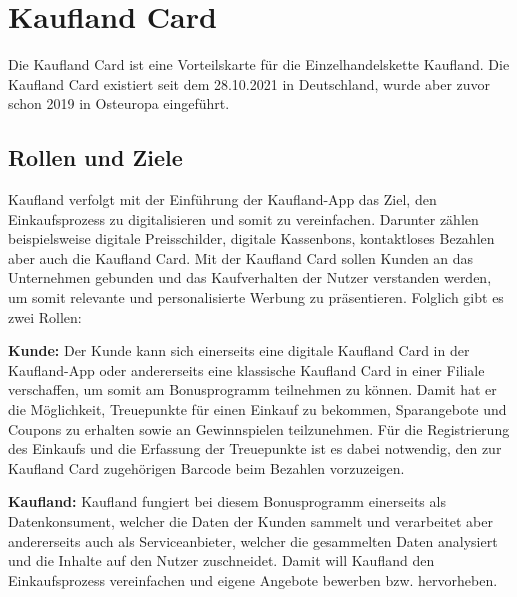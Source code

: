 \section{Kaufland Card}
Die Kaufland Card ist eine Vorteilskarte für die Einzelhandelskette Kaufland. Die Kaufland Card existiert seit dem 28.10.2021 in Deutschland, wurde aber zuvor schon 2019 in Osteuropa eingeführt.

\subsection{Rollen und Ziele}
Kaufland verfolgt mit der Einführung der Kaufland-App das Ziel, den Einkaufsprozess zu digitalisieren und somit zu vereinfachen. Darunter zählen beispielsweise digitale Preisschilder, digitale Kassenbons, kontaktloses Bezahlen aber auch die Kaufland Card. \cite{Kaufland_Ziele} Mit der Kaufland Card sollen Kunden an das Unternehmen gebunden und das Kaufverhalten der Nutzer verstanden werden, um somit relevante und personalisierte Werbung zu präsentieren. \cite{Kaufland_Datenschutz} Folglich gibt es zwei Rollen: \newline

\noindent \textbf{Kunde:} Der Kunde kann sich einerseits eine digitale Kaufland Card in der Kaufland-App oder andererseits eine klassische Kaufland Card in einer Filiale verschaffen, um somit am Bonusprogramm teilnehmen zu können. Damit hat er die Möglichkeit, Treuepunkte für einen Einkauf zu bekommen, Sparangebote und Coupons zu erhalten sowie an Gewinnspielen teilzunehmen. Für die Registrierung des Einkaufs und die Erfassung der Treuepunkte ist es dabei notwendig, den zur Kaufland Card zugehörigen Barcode beim Bezahlen vorzuzeigen. \newline

\noindent \textbf{Kaufland:} Kaufland fungiert bei diesem Bonusprogramm einerseits als Datenkonsument, welcher die Daten der Kunden sammelt und verarbeitet aber andererseits auch als Serviceanbieter, welcher die gesammelten Daten analysiert und die Inhalte auf den Nutzer zuschneidet. Damit will Kaufland den Einkaufsprozess vereinfachen und eigene Angebote bewerben bzw. hervorheben.

